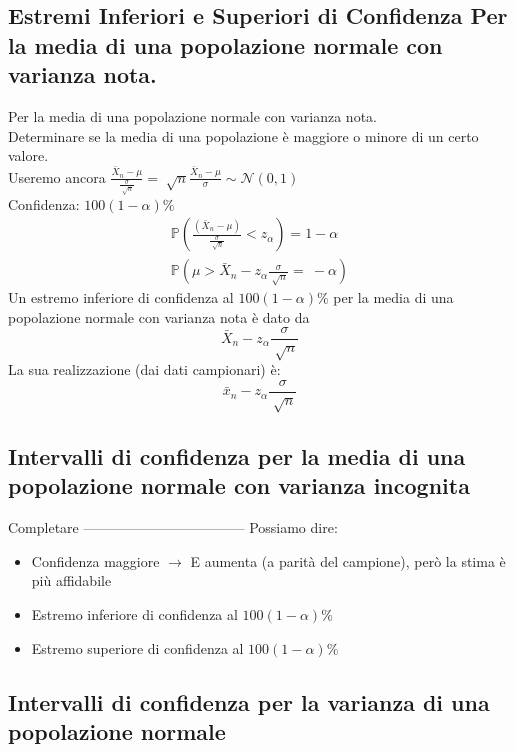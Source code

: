 \documentclass[12pt, a4paper, openany]{book}
\begin{document}
\subsection*{Estremi Inferiori e Superiori di Confidenza Per la media di una popolazione normale con varianza nota.}
Per la media di una popolazione normale con varianza nota.
\\ Determinare se la media di una popolazione è maggiore o minore di un certo
valore.
\\ Useremo ancora $\frac{\bar{X}_n - \mu}{\frac{\sigma}{\sqrt[]{n}}} = 
\sqrt[]{n} \frac{\bar{X}_n - \mu}{\sigma} \sim \mathcal{N}(0,1)$ 
\\ Confidenza: $100(1-\alpha) \%$
\begin{gather*}
    \mathbb{P}(\frac{(\bar{X}_n - \mu)}{\frac{\sigma}{\sqrt[]{n}}} < z_\alpha) 
    = 1 - \alpha \\
    \mathbb{P}(\mu > \bar{X}_n - z_\alpha \frac{\sigma}{\sqrt[]{n}} = \ - \alpha)
\end{gather*}
Un estremo inferiore di confidenza al $100(1-\alpha)\%$ per la media di una
popolazione normale con varianza nota è dato da
\begin{equation*}
    \bar{X}_n - z_\alpha \frac{\sigma}{\sqrt[]{n}}
\end{equation*}
La sua realizzazione (dai dati campionari) è:
\begin{equation*}
    \bar{x}_n - z_\alpha\frac{\sigma}{\sqrt[]{n}}
\end{equation*}
\subsection*{Intervalli di confidenza per la media di una popolazione normale con varianza incognita}
Completare -----------------------------------
Possiamo dire:
\begin{itemize}
    \item Confidenza maggiore $\rightarrow$ E aumenta (a parità del campione), però la
    stima è più affidabile
    \item Estremo inferiore di confidenza al $100(1-\alpha) \%$
    \item Estremo superiore di confidenza al $100(1-\alpha) \%$
\end{itemize}
\subsection*{Intervalli di confidenza per la varianza di una popolazione normale}
\end{document}
